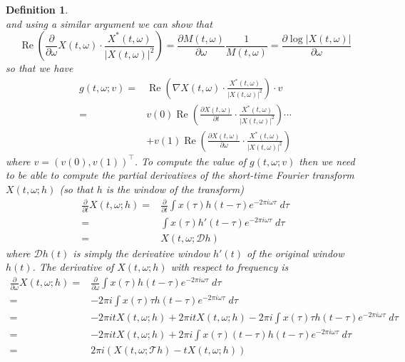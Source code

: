 \documentclass[english]{article}
\newtheorem{defn}{Definition}[section]
\begin{document}
\begin{defn}
\begin{equation}
\end{equation}
and using a similar argument we can show that
\begin{equation}\label{eq:realpartfreqderivative}
\operatorname{Re}\left(\frac{\partial}{\partial \omega} X(t,\omega) \cdot \frac{X^*(t,\omega)}{|X(t,\omega)|^2}\right) = \frac{\partial M(t,\omega) }{\partial \omega }  \frac{1}{M(t,\omega)} = \frac{\partial \log |X(t,\omega)| }{\partial \omega}
\end{equation}
so that we have
\begin{align}
g(t,\omega ; v) =& \operatorname{Re}\left(\nabla X(t,\omega) \cdot \frac{X^*(t,\omega)}{|X(t,\omega)|^2}\right) \cdot v\\
=& v(0)\operatorname{Re}\left(\frac{\partial X(t,\omega)}{\partial t} \cdot \frac{X^*(t,\omega)}{|X(t,\omega)|^2}\right)\cdots\\
& + v(1)\operatorname{Re}\left(\frac{\partial X(t,\omega)}{\partial \omega} \cdot \frac{X^*(t,\omega)}{|X(t,\omega)|^2}\right)
\end{align}
where $v=(v(0),v(1))^\top$. To compute the value of $g(t,\omega ; v)$ then we need to be able to compute the partial
derivatives of the short-time Fourier transform $X(t,\omega; h)$ (so that $h$ is the window of the transform)
\begin{align}
\frac{\partial}{\partial t} X(t,\omega; h) =& \frac{\partial}{\partial t} \int x(\tau) h(t-\tau) e^{-2\pi i \omega \tau}\; d\tau\\
=& \int x(\tau) h'(t-\tau) e^{-2\pi i \omega \tau}\; d\tau\\
\label{eq:dXdt}=& X(t,\omega ; \mathcal{D}h)
\end{align}
where $\mathcal{D}h(t)$ is simply the derivative window $h'(t)$ of the original window $h(t)$.  The derivative of $X(t,\omega ; h)$
with respect to frequency is
\begin{align}
\frac{\partial}{\partial \omega} X(t,\omega; h) =& \frac{\partial}{\partial \omega} \int x(\tau) h(t-\tau) e^{-2\pi i \omega \tau}\; d\tau\\
=& - 2\pi i \int x(\tau) \tau h(t-\tau) e^{-2\pi i \omega \tau}\; d\tau\\
=& -2 \pi itX(t,\omega ; h) + 2\pi itX(t,\omega ; h) - 2\pi i \int x(\tau) \tau h(t-\tau) e^{-2\pi i \omega \tau}\; d\tau\\
=&  -2 \pi itX(t,\omega ; h) + 2\pi i\int x(\tau)(t- \tau) h(t-\tau) e^{-2\pi i \omega \tau}\; d\tau\\
\label{eq:dXdw}=& 2\pi i ( X(t,\omega ; \mathcal{T}h) - tX(t,\omega ; h))

\end{align}
\end{defn}
\end{document}
